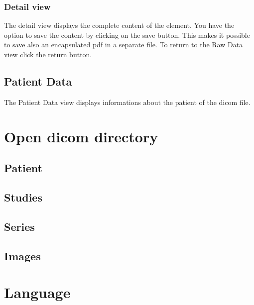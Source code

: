 		\subsubsection{Detail view}
		The detail view displays the complete content of the element. You have the
		option to save the content by clicking on the save button. This makes it
		possible to save also an encapsulated pdf in a separate file.
		To return to the Raw Data view click the return button.
		
	\subsection{Patient Data}
	The Patient Data view displays informations about the patient of the dicom
	file.
	
\section{Open dicom directory}

	\subsection{Patient}
	\subsection{Studies}
	\subsection{Series}
	\subsection{Images}
	
\section{Language}

%
%